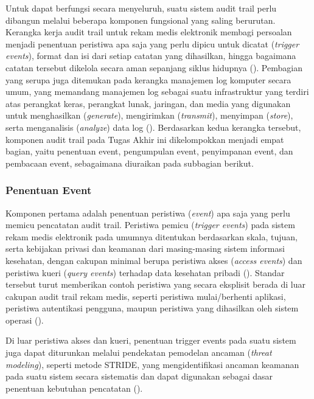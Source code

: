 Untuk dapat berfungsi secara menyeluruh, suatu sistem audit trail perlu dibangun melalui beberapa komponen fungsional yang saling berurutan. Kerangka kerja audit trail untuk rekam medis elektronik membagi persoalan menjadi penentuan peristiwa apa saja yang perlu dipicu untuk dicatat (\textit{trigger events}), format dan isi dari setiap catatan yang dihasilkan, hingga bagaimana catatan tersebut dikelola secara aman sepanjang siklus hidupnya (\cite{iso27789_2021}). Pembagian yang serupa juga ditemukan pada kerangka manajemen log komputer secara umum, yang memandang manajemen log sebagai suatu infrastruktur yang terdiri atas perangkat keras, perangkat lunak, jaringan, dan media yang digunakan untuk menghasilkan (\textit{generate}), mengirimkan (\textit{transmit}), menyimpan (\textit{store}), serta menganalisis (\textit{analyze}) data log (\cite{nist80092}). Berdasarkan kedua kerangka tersebut, komponen audit trail pada Tugas Akhir ini dikelompokkan menjadi empat bagian, yaitu penentuan event, pengumpulan event, penyimpanan event, dan pembacaan event, sebagaimana diuraikan pada subbagian berikut.

\subsubsection{Penentuan Event}
\label{subsubsec:penentuan-event}

Komponen pertama adalah penentuan peristiwa (\textit{event}) apa saja yang perlu memicu pencatatan audit trail. Peristiwa pemicu (\textit{trigger events}) pada sistem rekam medis elektronik pada umumnya ditentukan berdasarkan skala, tujuan, serta kebijakan privasi dan keamanan dari masing-masing sistem informasi kesehatan, dengan cakupan minimal berupa peristiwa akses (\textit{access events}) dan peristiwa kueri (\textit{query events}) terhadap data kesehatan pribadi (\cite{iso27789_2021}). Standar tersebut turut memberikan contoh peristiwa yang secara eksplisit berada di luar cakupan audit trail rekam medis, seperti peristiwa mulai/berhenti aplikasi, peristiwa autentikasi pengguna, maupun peristiwa yang dihasilkan oleh sistem operasi (\cite{iso27789_2021}).

Di luar peristiwa akses dan kueri, penentuan trigger events pada suatu sistem juga dapat diturunkan melalui pendekatan pemodelan ancaman (\textit{threat modeling}), seperti metode STRIDE, yang mengidentifikasi ancaman keamanan pada suatu sistem secara sistematis dan dapat digunakan sebagai dasar penentuan kebutuhan pencatatan (\cite{laksono2021stride}).

